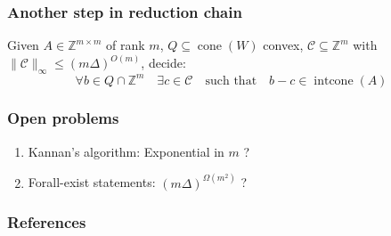\documentclass[aspectratio=169,xcolor=dvipsnames,noframenumbering]{beamer}
\newcommand{\cone}{\operatorname{cone}}
\newcommand{\intcone}{\operatorname{intcone}}
\newcommand{\C}{\mathcal{C}}
\begin{document}
\begin{frame}[t]
  \frametitle{Another step in reduction chain}

  \begin{exampleblock}{}
     Given $A ∈ℤ^{m ×m}$ of rank $m$,  $Q ⊆ \cone(W)$  convex,  $𝒞 ⊆ ℤ^m$ with  $\|\C\|_∞ ≤  (mΔ)^{O(m)}$,  decide: 
\begin{equation*}
  \label{eq:13}
   ∀ b ∈Q ∩ ℤ^m \quad ∃ c ∈ 𝒞 \quad \text{such that} \quad  b-c ∈ \intcone(A)
 \end{equation*}
  \end{exampleblock}
\end{frame}

\begin{frame}
  \frametitle{Open problems }

  \begin{enumerate}
  \item Kannan's algorithm: Exponential in $m$ ?
  \item Forall-exist statements: $(m Δ)^{Ω(m^2)}$ ?
  \end{enumerate}
\end{frame}

\begin{frame}
  \frametitle{References}
   
\end{frame}

 
\end{document}
